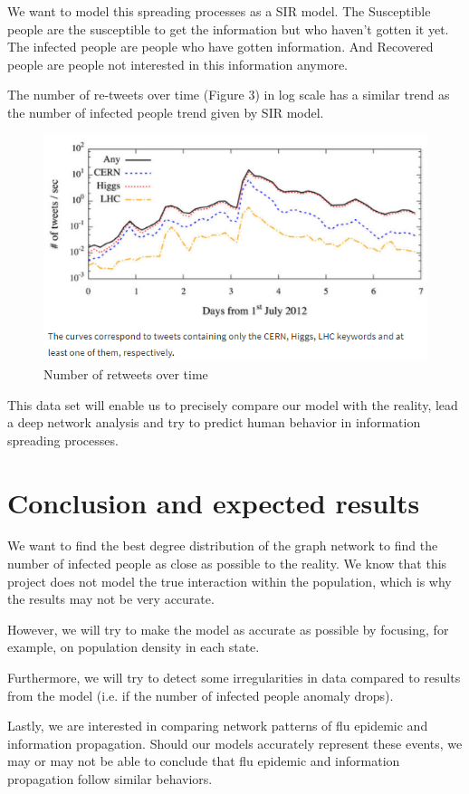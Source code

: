  We want to model this spreading processes as a SIR model. The Susceptible people are the susceptible to get the information but who haven't gotten it yet. The infected people are people who have gotten information. And Recovered people are people not interested in this information anymore.

The number of re-tweets over time (Figure 3)\cite{article} in log scale has a similar trend as the number of infected people trend given by SIR model.

\begin{figure}
    \centering
    \includegraphics[scale=0.5]{Capture.PNG}
    \caption{Number of retweets over time}
    \label{fig:my_label}
\end{figure}



This data set will enable us to precisely compare our model with the reality, lead a deep network analysis and try to predict human behavior in information spreading processes.


\section{Conclusion and expected results}

We want to find the best degree distribution of the graph network to find the number of infected people as close as possible
to the reality.
We know that this project does not model the true interaction within the population, which is why the results may not be very accurate.

However, we will try to make the model as accurate as possible by focusing, for example, on population density in each state.

Furthermore, we will try to detect some irregularities in data compared to results from the model (i.e. if the number of infected people anomaly drops).

Lastly, we are interested in comparing network patterns of flu epidemic and information propagation. Should our models accurately represent these events, we may or may not be able to conclude that flu epidemic and information propagation follow similar behaviors.








